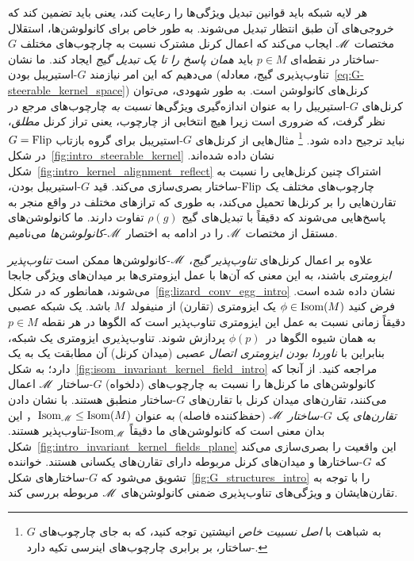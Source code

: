 هر لایه شبکه باید قوانین تبدیل ویژگی‌ها را رعایت کند، یعنی باید تضمین کند که خروجی‌های آن طبق انتظار تبدیل می‌شوند.
به طور خاص برای کانولوشن‌ها، استقلال مختصات $\mathscr{M}$ ایجاب می‌کند که اعمال کرنل مشترک نسبت به چارچوب‌های مختلف $G$-ساختار در نقطه‌ای $p\in M$ باید \emph{همان پاسخ را تا یک تبدیل گیج} ایجاد کند.
ما نشان می‌دهیم که این امر نیازمند $G$-استیریبل بودن (تناوب‌پذیری گیج، معادله~\eqref{eq:G-steerable_kernel_space}) کرنل‌های کانولوشن است.
به طور شهودی، می‌توان کرنل‌های $G$-استیریبل را به عنوان اندازه‌گیری ویژگی‌ها \emph{نسبت به} چارچوب‌های مرجع در نظر گرفت، که ضروری است زیرا هیچ انتخابی از چارچوب، یعنی تراز کرنل \emph{مطلق}، نباید ترجیح داده شود.%
\footnote{
	به شباهت با \emph{اصل نسبیت خاص} انیشتین توجه کنید، که به جای چارچوب‌های $G$-ساختار، بر برابری چارچوب‌های اینرسی تکیه دارد.
}
مثال‌هایی از کرنل‌های $G$-استیریبل برای گروه بازتاب $G=\text{Flip}$ در شکل~\ref{fig:intro_steerable_kernel} نشان داده شده‌اند.
شکل~\ref{fig:intro_kernel_alignment_reflect} اشتراک چنین کرنل‌هایی را نسبت به چارچوب‌های مختلف یک $\text{Flip}$-ساختار بصری‌سازی می‌کند.
قید $G$-استیریبل بودن، تقارن‌هایی را بر کرنل‌ها تحمیل می‌کند، به طوری که ترازهای مختلف در واقع منجر به پاسخ‌هایی می‌شوند که دقیقاً با تبدیل‌های گیج $\rho(g)$ تفاوت دارند.
ما کانولوشن‌های مستقل از مختصات $\mathscr{M}$ را در ادامه به اختصار $\mathscr{M}$-\emph{کانولوشن‌ها} می‌نامیم.


علاوه بر اعمال کرنل‌های \emph{تناوب‌پذیر گیج}، $\mathscr{M}$-کانولوشن‌ها ممکن است \emph{تناوب‌پذیر ایزومتری} باشند، به این معنی که آن‌ها با عمل ایزومتری‌ها بر میدان‌های ویژگی جابجا می‌شوند، همانطور که در شکل~\ref{fig:lizard_conv_egg_intro} نشان داده شده است.
فرض کنید $\phi \in \operatorname{Isom}(M)$ یک ایزومتری (تقارن) از منیفولد~$M$ باشد.
یک شبکه عصبی دقیقاً زمانی نسبت به عمل این ایزومتری تناوب‌پذیر است که الگوها در هر نقطه $p\in M$ به همان شیوه الگوها در~$\phi(p)$ پردازش شوند.
تناوب‌پذیری ایزومتری یک شبکه، بنابراین با \emph{ناوردا بودن ایزومتری اتصال عصبی} (میدان کرنل) آن مطابقت یک به یک دارد؛ به شکل~\ref{fig:isom_invariant_kernel_field_intro} مراجعه کنید.
از آنجا که کانولوشن‌های ما کرنل‌ها را نسبت به چارچوب‌های (دلخواه) $G$-ساختار $\mathscr{M}$ اعمال می‌کنند، تقارن‌های میدان کرنل با تقارن‌های $G$-ساختار منطبق هستند.
با نشان دادن \emph{تقارن‌های یک $G$-ساختار} $\mathscr{M}$ (حفظ‌کننده فاصله) به عنوان $\operatorname{Isom}_{\mathscr{M}} \leq \operatorname{Isom}(M)$， این بدان معنی است که کانولوشن‌های ما دقیقاً $\operatorname{Isom}_{\mathscr{M}}$-تناوب‌پذیر هستند.
شکل~\ref{fig:intro_invariant_kernel_fields_plane} این واقعیت را بصری‌سازی می‌کند که $G$-ساختارها و میدان‌های کرنل مربوطه دارای تقارن‌های یکسانی هستند.
خواننده تشویق می‌شود که $G$-ساختارهای شکل~\ref{fig:G_structures_intro} را با توجه به تقارن‌هایشان و ویژگی‌های تناوب‌پذیری ضمنی کانولوشن‌های $\mathscr{M}$ مربوطه بررسی کند.


